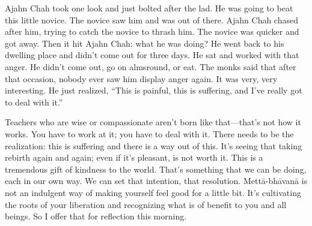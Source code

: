 Ajahn Chah took one look and just bolted after the lad. He was going to
beat this little novice. The novice saw him and was out of there. Ajahn
Chah chased after him, trying to catch the novice to thrash him. The
novice was quicker and got away. Then it hit Ajahn Chah: what he was
doing? He went back to his dwelling place and didn’t come out for three
days. He sat and worked with that anger. He didn’t come out, go on
almsround, or eat. The monks said that after that occasion, nobody ever
saw him display anger again. It was very, very interesting. He just
realized, “This is painful, this is suffering, and I’ve really got to
deal with it.”

Teachers who are wise or compassionate aren’t born like that—that’s not
how it works. You have to work at it; you have to deal with it. There
needs to be the realization: this is suffering and there is a way out of
this. It’s seeing that taking rebirth again and again; even if it’s
pleasant, is not worth it. This is a tremendous gift of kindness to the
world. That’s something that we can be doing, each in our own way. We
can set that intention, that resolution. Mettā-bhāvanā is not an
indulgent way of making yourself feel good for a little bit. It’s
cultivating the roots of your liberation and recognizing what is of
benefit to you and all beings. So I offer that for reflection this
morning.
